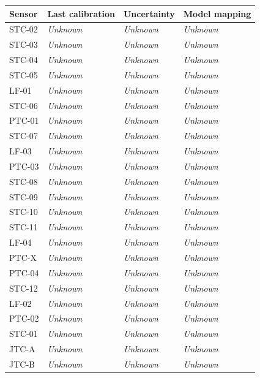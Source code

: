 \documentclass[11pt]{article}
\begin{document}
\begin{longtable}{p{}p{}p{}p{}}
\toprule
\textbf{Sensor} & \textbf{Last calibration} & \textbf{Uncertainty} & \textbf{Model mapping} \\\midrule\endhead
STC-02 & \textit{Unknown} & \textit{Unknown} & \textit{Unknown} \\[3pt]
STC-03 & \textit{Unknown} & \textit{Unknown} & \textit{Unknown} \\[3pt]
STC-04 & \textit{Unknown} & \textit{Unknown} & \textit{Unknown} \\[3pt]
STC-05 & \textit{Unknown} & \textit{Unknown} & \textit{Unknown} \\[3pt]
LF-01 & \textit{Unknown} & \textit{Unknown} & \textit{Unknown} \\[3pt]
STC-06 & \textit{Unknown} & \textit{Unknown} & \textit{Unknown} \\[3pt]
PTC-01 & \textit{Unknown} & \textit{Unknown} & \textit{Unknown} \\[3pt]
STC-07 & \textit{Unknown} & \textit{Unknown} & \textit{Unknown} \\[3pt]
LF-03 & \textit{Unknown} & \textit{Unknown} & \textit{Unknown} \\[3pt]
PTC-03 & \textit{Unknown} & \textit{Unknown} & \textit{Unknown} \\[3pt]
STC-08 & \textit{Unknown} & \textit{Unknown} & \textit{Unknown} \\[3pt]
STC-09 & \textit{Unknown} & \textit{Unknown} & \textit{Unknown} \\[3pt]
STC-10 & \textit{Unknown} & \textit{Unknown} & \textit{Unknown} \\[3pt]
STC-11 & \textit{Unknown} & \textit{Unknown} & \textit{Unknown} \\[3pt]
LF-04 & \textit{Unknown} & \textit{Unknown} & \textit{Unknown} \\[3pt]
PTC-X & \textit{Unknown} & \textit{Unknown} & \textit{Unknown} \\[3pt]
PTC-04 & \textit{Unknown} & \textit{Unknown} & \textit{Unknown} \\[3pt]
STC-12 & \textit{Unknown} & \textit{Unknown} & \textit{Unknown} \\[3pt]
LF-02 & \textit{Unknown} & \textit{Unknown} & \textit{Unknown} \\[3pt]
PTC-02 & \textit{Unknown} & \textit{Unknown} & \textit{Unknown} \\[3pt]
STC-01 & \textit{Unknown} & \textit{Unknown} & \textit{Unknown} \\[3pt]
JTC-A & \textit{Unknown} & \textit{Unknown} & \textit{Unknown} \\[3pt]
JTC-B & \textit{Unknown} & \textit{Unknown} & \textit{Unknown} \\[3pt]
\bottomrule\end{longtable}\normalsize
\end{document}
